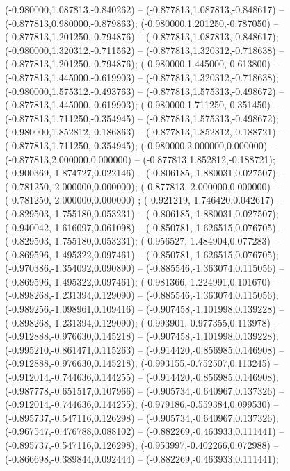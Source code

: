  (-0.980000,1.087813,-0.840262) -- (-0.877813,1.087813,-0.848617) -- (-0.877813,0.980000,-0.879863);
 (-0.980000,1.201250,-0.787050) -- (-0.877813,1.201250,-0.794876) -- (-0.877813,1.087813,-0.848617);
 (-0.980000,1.320312,-0.711562) -- (-0.877813,1.320312,-0.718638) -- (-0.877813,1.201250,-0.794876);
 (-0.980000,1.445000,-0.613800) -- (-0.877813,1.445000,-0.619903) -- (-0.877813,1.320312,-0.718638);
 (-0.980000,1.575312,-0.493763) -- (-0.877813,1.575313,-0.498672) -- (-0.877813,1.445000,-0.619903);
 (-0.980000,1.711250,-0.351450) -- (-0.877813,1.711250,-0.354945) -- (-0.877813,1.575313,-0.498672);
 (-0.980000,1.852812,-0.186863) -- (-0.877813,1.852812,-0.188721) -- (-0.877813,1.711250,-0.354945);
 (-0.980000,2.000000,0.000000) -- (-0.877813,2.000000,0.000000) -- (-0.877813,1.852812,-0.188721);
 (-0.900369,-1.874727,0.022146) -- (-0.806185,-1.880031,0.027507) -- (-0.781250,-2.000000,0.000000);
 (-0.877813,-2.000000,0.000000) -- (-0.781250,-2.000000,0.000000) ;
 (-0.921219,-1.746420,0.042617) -- (-0.829503,-1.755180,0.053231) -- (-0.806185,-1.880031,0.027507);
 (-0.940042,-1.616097,0.061098) -- (-0.850781,-1.626515,0.076705) -- (-0.829503,-1.755180,0.053231);
 (-0.956527,-1.484904,0.077283) -- (-0.869596,-1.495322,0.097461) -- (-0.850781,-1.626515,0.076705);
 (-0.970386,-1.354092,0.090890) -- (-0.885546,-1.363074,0.115056) -- (-0.869596,-1.495322,0.097461);
 (-0.981366,-1.224991,0.101670) -- (-0.898268,-1.231394,0.129090) -- (-0.885546,-1.363074,0.115056);
 (-0.989256,-1.098961,0.109416) -- (-0.907458,-1.101998,0.139228) -- (-0.898268,-1.231394,0.129090);
 (-0.993901,-0.977355,0.113978) -- (-0.912888,-0.976630,0.145218) -- (-0.907458,-1.101998,0.139228);
 (-0.995210,-0.861471,0.115263) -- (-0.914420,-0.856985,0.146908) -- (-0.912888,-0.976630,0.145218);
 (-0.993155,-0.752507,0.113245) -- (-0.912014,-0.744636,0.144255) -- (-0.914420,-0.856985,0.146908);
 (-0.987778,-0.651517,0.107966) -- (-0.905734,-0.640967,0.137326) -- (-0.912014,-0.744636,0.144255);
 (-0.979186,-0.559384,0.099530) -- (-0.895737,-0.547116,0.126298) -- (-0.905734,-0.640967,0.137326);
 (-0.967547,-0.476788,0.088102) -- (-0.882269,-0.463933,0.111441) -- (-0.895737,-0.547116,0.126298);
 (-0.953997,-0.402266,0.072988) -- (-0.866698,-0.389844,0.092444) -- (-0.882269,-0.463933,0.111441);

